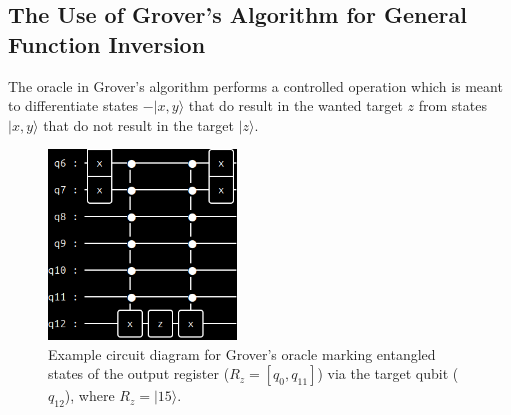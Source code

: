 \documentclass[twocolumn]{cinc}
\begin{document}
  \subsection{The Use of Grover's Algorithm for General Function Inversion} 

  The oracle in Grover's algorithm performs a controlled operation which is meant
  to differentiate states $-|x,y\rangle$ that do result in the wanted target $z$ from 
  states $|x,y\rangle$ that do not result in the target $|z\rangle$.
  
  \begin{figure}[!ht]
  \centering
  \includegraphics[width=5.0cm]{oracle_15.png}
  \caption{Example circuit diagram for Grover's oracle marking entangled states 
  of the output register ($R_z=[q_0,q_{11}]$) via the target qubit ($q_{12}$), where
  $R_z=|15\rangle$.}\label{fig:FIGURA2}
  \end{figure}
\end{document}
